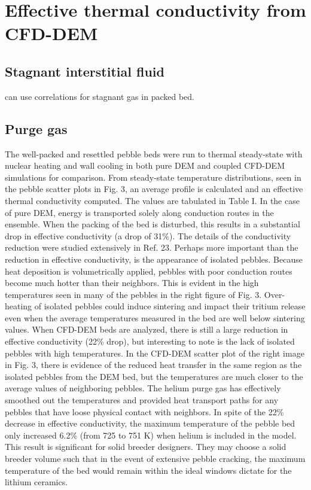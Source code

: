 \section{Effective thermal conductivity from CFD-DEM}

\subsection{Stagnant interstitial fluid}
can use correlations for stagnant gas in packed bed.



\subsection{Purge gas}
The well-packed and resettled pebble beds were run to thermal steady-state with nuclear heating and wall cooling in both pure DEM and coupled CFD-DEM simulations for comparison. From steady-state temperature distributions, seen in the pebble scatter plots in Fig. 3, an average profile is calculated and an effective thermal conductivity computed. The values are tabulated in Table I. 
In the case of pure DEM, energy is transported solely along conduction routes in the ensemble. When the packing of the bed is disturbed, this results in a substantial drop in effective conductivity (a drop of 31\%). The details of the conductivity reduction were studied extensively in Ref. 23. Perhaps more important than the reduction in effective conductivity, is the appearance of isolated pebbles. Because heat deposition is volumetrically applied, pebbles with poor conduction routes become much hotter than their neighbors. This is evident in the high temperatures seen in many of the pebbles in the right figure of Fig. 3. Over-heating of isolated pebbles could induce sintering and impact their tritium release even when the average temperatures measured in the bed are well below sintering values.
When CFD-DEM beds are analyzed, there is still a large reduction in effective conductivity (22\% drop), but interesting to note is the lack of isolated pebbles with high temperatures. In the CFD-DEM scatter plot of the right image in Fig. 3, there is evidence of the reduced heat transfer in the same region as the isolated pebbles from the DEM bed, but the temperatures are much closer to the average values of neighboring pebbles. The helium purge gas has effectively smoothed out the temperatures and provided heat transport paths for any pebbles that have loose physical contact with neighbors.
In spite of the 22\% decrease in effective conductivity, the maximum temperature of the pebble bed only increased 6.2\% (from 725 to 751 K) when helium is included in the model. This result is significant for solid breeder designers. They may choose a solid breeder volume such that in the event of extensive pebble cracking, the maximum temperature of the bed would remain within the ideal windows dictate for the lithium ceramics.

